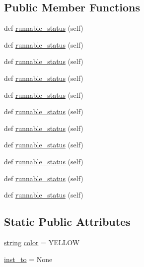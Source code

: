 \subsection*{Public Member Functions}
\begin{DoxyCompactItemize}
\item 
def \hyperlink{classwaflib_1_1_tools_1_1cs_1_1fake__csshlib_a43a9727fb4961a37b06b39dcc2362fe3}{runnable\+\_\+status} (self)
\item 
def \hyperlink{classwaflib_1_1_tools_1_1cs_1_1fake__csshlib_a43a9727fb4961a37b06b39dcc2362fe3}{runnable\+\_\+status} (self)
\item 
def \hyperlink{classwaflib_1_1_tools_1_1cs_1_1fake__csshlib_a43a9727fb4961a37b06b39dcc2362fe3}{runnable\+\_\+status} (self)
\item 
def \hyperlink{classwaflib_1_1_tools_1_1cs_1_1fake__csshlib_a43a9727fb4961a37b06b39dcc2362fe3}{runnable\+\_\+status} (self)
\item 
def \hyperlink{classwaflib_1_1_tools_1_1cs_1_1fake__csshlib_a43a9727fb4961a37b06b39dcc2362fe3}{runnable\+\_\+status} (self)
\item 
def \hyperlink{classwaflib_1_1_tools_1_1cs_1_1fake__csshlib_a43a9727fb4961a37b06b39dcc2362fe3}{runnable\+\_\+status} (self)
\item 
def \hyperlink{classwaflib_1_1_tools_1_1cs_1_1fake__csshlib_a43a9727fb4961a37b06b39dcc2362fe3}{runnable\+\_\+status} (self)
\item 
def \hyperlink{classwaflib_1_1_tools_1_1cs_1_1fake__csshlib_a43a9727fb4961a37b06b39dcc2362fe3}{runnable\+\_\+status} (self)
\item 
def \hyperlink{classwaflib_1_1_tools_1_1cs_1_1fake__csshlib_a43a9727fb4961a37b06b39dcc2362fe3}{runnable\+\_\+status} (self)
\item 
def \hyperlink{classwaflib_1_1_tools_1_1cs_1_1fake__csshlib_a43a9727fb4961a37b06b39dcc2362fe3}{runnable\+\_\+status} (self)
\item 
def \hyperlink{classwaflib_1_1_tools_1_1cs_1_1fake__csshlib_a43a9727fb4961a37b06b39dcc2362fe3}{runnable\+\_\+status} (self)
\end{DoxyCompactItemize}
\subsection*{Static Public Attributes}
\begin{DoxyCompactItemize}
\item 
\hyperlink{test__lib_f_l_a_c_2format_8c_ab02026ad0de9fb6c1b4233deb0a00c75}{string} \hyperlink{classwaflib_1_1_tools_1_1cs_1_1fake__csshlib_a824031b39d363445f9e595e53553df2f}{color} = \textquotesingle{}Y\+E\+L\+L\+OW\textquotesingle{}
\item 
\hyperlink{classwaflib_1_1_tools_1_1cs_1_1fake__csshlib_a3326fadb18c88deebd2ec0deee3d8b17}{inst\+\_\+to} = None
\end{DoxyCompactItemize}
